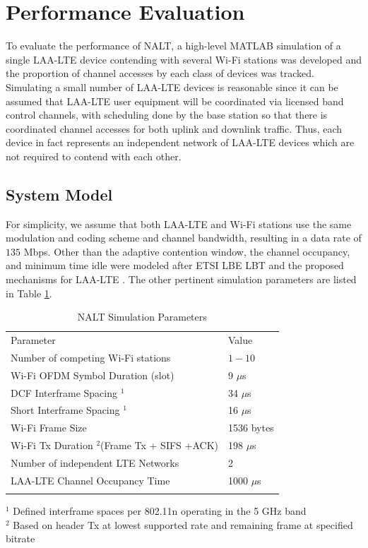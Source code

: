 \section{Performance Evaluation}\label{perf-eval}
To evaluate the performance of NALT, a high-level MATLAB simulation of a single \mbox{LAA-LTE} device contending with several \mbox{Wi-Fi} stations was developed and the proportion of channel accesses by each class of devices was tracked.  Simulating a small number of \mbox{LAA-LTE} devices is reasonable since it can be assumed that \mbox{LAA-LTE} user equipment will be coordinated via licensed band control channels, with scheduling done by the base station so that there is coordinated channel accesses for both uplink and downlink traffic.  Thus, each device in fact represents an independent network of LAA-LTE devices which are not required to contend with each other.


\subsection{System Model}
\label{sys-model}
For simplicity, we assume that both \mbox{LAA-LTE} and \mbox{Wi-Fi} stations use the same modulation and coding scheme and channel bandwidth, resulting in a data rate of $135$ Mbps.  Other than the adaptive contention window, the channel occupancy, and minimum time idle were modeled after ETSI LBE LBT and the proposed mechanisms for \mbox{LAA-LTE} \cite{3gpp}. The other pertinent simulation parameters are listed in Table \ref{params}.
\begin{table}
	\caption{NALT Simulation Parameters}
	\label{params}      
	\begin{tabular}{p{7cm}p{5cm}}
		\hline\noalign{\smallskip}
		Parameter & Value \\
		\noalign{\smallskip}\svhline\noalign{\smallskip}
		Number of competing \mbox{Wi-Fi} stations& $1 - 10$ \\ 
		Wi-Fi OFDM Symbol Duration (slot) & 9 $\mu$s    \\ 
		DCF Interframe Spacing $^1$ & 34 $\mu$s   \\ 
		Short Interframe Spacing $^1$ & 16 $\mu$s   \\ 
		\mbox{Wi-Fi} Frame Size & 1536 bytes  \\ 
		\mbox{Wi-Fi} Tx Duration $^2$(Frame Tx + SIFS +ACK) & 198 $\mu$s   \\ 
		Number of independent LTE Networks & 2 \\
		\mbox{LAA-LTE} Channel Occupancy Time  & 1000 $\mu$s \\ 	
		\noalign{\smallskip}\hline\noalign{\smallskip}
	\end{tabular}
	$^1$ Defined interframe spaces per 802.11n operating in the 5 GHz band \\
	$^2$ Based on header Tx at lowest supported rate and remaining frame at specified bitrate	 
\end{table}

